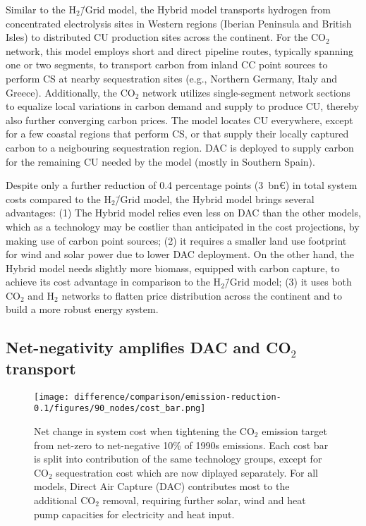 \documentclass[twocolumn]{article}
\newcommand{\COtwo}{CO$_2$}
\newcommand{\Htwo}{H$_2$}
\newcommand{\modH}{H$_2$\=/Grid model}
\newcommand{\modHybrid}{Hybrid model}
\newcommand{\carbon}{CO$_2$}
\begin{document}
Similar to the \modH{}, the \modHybrid{} transports hydrogen from concentrated electrolysis sites in Western regions (Iberian Peninsula and British Isles) to distributed CU production sites across the continent. For the \COtwo{} network, this model employs short and direct pipeline routes, typically spanning one or two segments, to transport carbon from inland CC point sources to perform CS at nearby sequestration sites (e.g., Northern Germany, Italy and Greece). Additionally, the \COtwo{} network utilizes single-segment network sections to equalize local variations in carbon demand and supply to produce CU, thereby also further converging carbon prices. The model locates CU everywhere, except for a few coastal regions that perform CS, or that supply their locally captured carbon to a neigbouring sequestration region. DAC is deployed to supply carbon for the remaining CU needed by the model (mostly in Southern Spain).

Despite only a further reduction of \label{}0.4 percentage points (\label{}3~bn€) in total system costs compared to the \modH{}, the \modHybrid{} brings several advantages: (1) The \modHybrid{} relies even less on DAC than the other models, which as a technology may be costlier than anticipated in the cost projections, by making use of carbon point sources; (2) it requires a smaller land use footprint for wind and solar power due to lower DAC deployment. On the other hand, the \modHybrid{} needs slightly more biomass, equipped with carbon capture, to achieve its cost advantage in comparison to the \modH{}; (3) it uses both \COtwo{} and \Htwo{} networks to flatten price distribution across the continent and to build a more robust energy system.

\subsection*{Net-negativity amplifies DAC and \carbon{} transport}\label{subsec:NN}

\begin{figure}[htb!]
    \centering
    \texttt{[image: difference/comparison/emission-reduction-0.1/figures/90\_nodes/cost\_bar.png]}
    \caption[short]{Net change in system cost when tightening the \COtwo{} emission target from net-zero to net-negative 10\% of 1990s emissions. Each cost bar is split into contribution of the same technology groups, except for \carbon{} sequestration cost which are now diplayed separately. For all models, Direct Air Capture (DAC) contributes most to the additional \carbon{} removal, requiring further solar, wind and heat pump capacities for electricity and heat input.}
    \label{fig:net-negative_cost_bar}
\end{figure}
\end{document}
